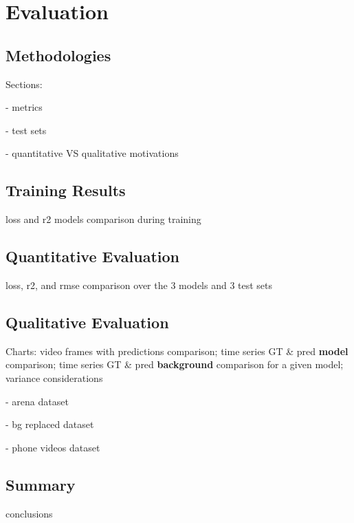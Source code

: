 \chapter{Evaluation}
\label{chap:evaluation}


\lipsum[1]



\section{Methodologies}
\label{sec:evaluation-methods}

Sections: 

- metrics

- test sets

- quantitative VS qualitative motivations


\section{Training Results}
\label{sec:evaluation-training}

loss and r2 models comparison during training


\section{Quantitative Evaluation}
\label{sec:evaluation-quantitative}

loss, r2, and rmse comparison over the 3 models and 3 test sets



\section{Qualitative Evaluation}
\label{sec:evaluation-qualitative}

Charts: video frames with predictions comparison; time series GT \& pred \textbf{model} comparison; time series GT \& pred \textbf{background} comparison for a given model; variance considerations

- arena dataset

- bg replaced dataset

- phone videos dataset


\section{Summary}
\label{sec:evaluation-summary}

conclusions